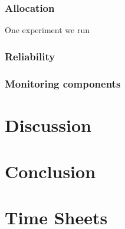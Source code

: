 \documentclass[a4paper]{IEEEtran}
\begin{document}
\subsubsection{Allocation}
One experiment we run 

\subsubsection{Reliability}

\subsubsection{Monitoring components}


\section{Discussion}

\section{Conclusion}

\appendix
\section{Time Sheets}
\end{document}
